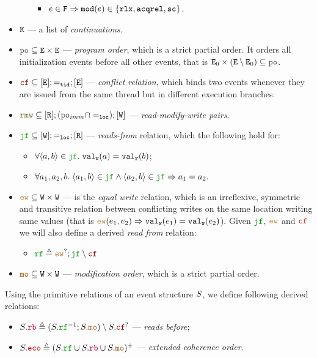 \documentclass[12pt]{article}
\begin{document}
\begin{definition}
\begin{itemize}
\begin{itemize}
\begin{itemize}
        \item $e \in {\mathtt{F}} \Rightarrow {\mathtt{mod}}(e) \in \{ \mathtt{rlx}, {\mathtt{acqrel}}, {\mathtt{sc}} \}$.
        \end{itemize}
    \end{itemize}
  \item ${\mathtt{K}}$ --- a list of \emph{continuations}.
  \item $\lPO \subseteq \lE \times \lE$ --- \emph{program order},
    which is a strict partial order.
    It orders all initialization events before all other events,
    that is $\lEo \times (\lE \setminus \lEo) \subseteq \lPO$.
  \item $\lCF \subseteq [\lE];=_{\lTID};[\lE]$ --- \emph{conflict relation},
    which binds two events whenever they are issued from the same thread but
    in different execution branches.    
  \item $\lRMW \subseteq [\lR];(\lPO_{imm} \cap =_{\lLOC});[\lW]$ ---
    \emph{read-modify-write pairs}.
  \item $\lJF \subseteq [\lW];=_{\lLOC};[\lR]$ --- \emph{reads-from} relation, which the following
    hold for:
    \begin{itemize}
    \item $\forall{\tup{a, b}} \in \lJF. \; \lVALW(a) = \lVALR(b)$;
    \item $\forall{a_1, a_2, b}. \;
      \tup{a_1, b} \in \lJF \wedge \tup{a_2, b} \in \lJF \Rightarrow a_1 = a_2.$
    \end{itemize}
  \item $\lEW \subseteq \lW \times \lW$ --- is the \emph{equal write} relation, 
    which is an irreflexive, symmetric and transitive relation between conflicting writes on the
    same location writing same values 
    (that is $\lEW(e_1, e_2) \Rightarrow \lVALW(e_1) = \lVALW(e_2)$).
    Given $\lJF$, $\lEW$ and $\lCF$ we will also define a derived \emph{read from} relation:
    \begin{itemize}
      \item $\lRF \defeq \lEW^?;\lJF \setminus \lCF$
    \end{itemize}
  \item $\lMO \subseteq \lW \times \lW$ --- \emph{modification order},
    which is a strict partial order.
  \end{itemize}
\end{definition}

\begin{definition}
  Using the primitive relations of an event structure $S$,
  we define following derived relations:
  \begin{itemize}
    \item $\lES.\lRB \defeq (\lES.\lRF^{-1};\lES.\lMO) \setminus \lES.\lCF^?$ --- 
      \emph{reads before};
    \item $\lES.\lECO \defeq (\lES.\lRF \cup \lES.\lRB \cup \lES.\lMO)^+$ --- 
      \emph{extended coherence order}.
  \end{itemize}
\end{definition}
\end{document}
